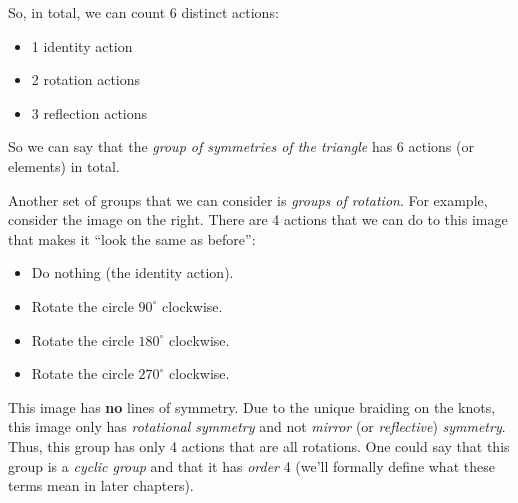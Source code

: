So, in total, we can count 6 distinct actions:
\begin{itemize}
    \item 1 identity action
    \item 2 rotation actions
    \item 3 reflection actions
\end{itemize}
So we can say that the \textit{group of symmetries of the triangle} has 6 actions (or elements) in total.

\begin{figure}
    \centering
\end{figure}

Another set of groups that we can consider is \textit{groups of rotation}. For example, consider the image on the right. There are 4 actions that we can do to this image that makes it ``look the same as before'':
\begin{itemize}
    \item Do nothing (the identity action).
    \item Rotate the circle $90^\circ$ clockwise.
    \item Rotate the circle $180^\circ$ clockwise.
    \item Rotate the circle $270^\circ$ clockwise.
\end{itemize}
This image has \textbf{no} lines of symmetry. Due to the unique braiding on the knots, this image only has \textit{rotational symmetry} and not \textit{mirror} (or \textit{reflective}) \textit{symmetry}. Thus, this group has only 4 actions that are all rotations. One could say that this group is a \textit{cyclic group} and that it has \textit{order} 4 (we’ll formally define what these terms mean in later chapters).

\begin{figure}
    \centering
\end{figure}


